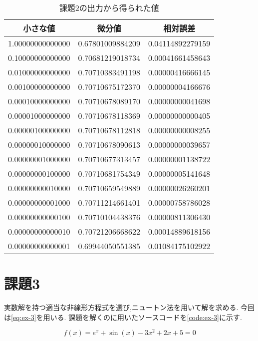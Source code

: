 \documentclass[autodetect-engine, dvi=dvipdfmx, 10pt, a4paper, ja=standard]{bxjsarticle}
\begin{document}
\begin{table}[htbp]
	\centering
	\caption{課題2の出力から得られた値}
	\label{table:ex-2}
	\begin{tabular}{@{}ccc@{}}
		\toprule
		小さな値             & 微分値              & 相対誤差             \\ \midrule
		1.00000000000000 & 0.67801009884209 & 0.04114892279159 \\
		0.10000000000000 & 0.70681219018734 & 0.00041661458643 \\
		0.01000000000000 & 0.70710383491198 & 0.00000416666145 \\
		0.00100000000000 & 0.70710675172370 & 0.00000004166676 \\
		0.00010000000000 & 0.70710678089170 & 0.00000000041698 \\
		0.00001000000000 & 0.70710678118369 & 0.00000000000405 \\
		0.00000100000000 & 0.70710678112818 & 0.00000000008255 \\
		0.00000010000000 & 0.70710678090613 & 0.00000000039657 \\
		0.00000001000000 & 0.70710677313457 & 0.00000001138722 \\
		0.00000000100000 & 0.70710681754349 & 0.00000005141648 \\
		0.00000000010000 & 0.70710659549889 & 0.00000026260201 \\
		0.00000000001000 & 0.70711214661401 & 0.00000758786028 \\
		0.00000000000100 & 0.70710104438376 & 0.00000811306430 \\
		0.00000000000010 & 0.70721206668622 & 0.00014889618156 \\
		0.00000000000001 & 0.69944050551385 & 0.01084175102922 \\ \bottomrule
	\end{tabular}
\end{table}

\section{課題3}
\label{sec:ex-3}

実数解を持つ適当な非線形方程式を選び,ニュートン法を用いて解を求める.
今回は\ref{eq:ex-3}を用いる.
課題を解くのに用いたソースコードを\ref{code:ex-3}に示す.

\begin{equation}
	\label{eq:ex-3}
	f(x) = e^x + \sin(x) - 3x^2 + 2x + 5 = 0
\end{equation}
\end{document}
